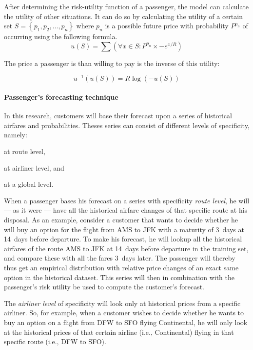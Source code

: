 After determining the risk-utility function of a passenger, the model can calculate the utility of other situations. It can do so by calculating the utility of a certain set $S = \left\{ p_1, p_2, \ldots, p_n\right\}$ where $p_n$ is a possible future price with probability $P^{p_n}$ of occurring using the following formula.
$$
u(S) = \sum (\forall x \in S: P^{p_n} \times -e^{x/R})
$$

The price a passenger is than willing to pay is the inverse of this utility:

$$
u^{-1}(u(S)) = R \log(-u(S))
$$


\paragraph{Passenger's forecasting technique}
In this research, customers will base their forecast upon a series of historical airfares and probabilities. Theses series can consist of different levels of specificity, namely: \begin{inparaenum}
    \item at route level,
    \item at airliner level, and
    \item at a global level.
    \end{inparaenum} When a passenger bases his forecast on a series with specificity \emph{route level}, he will --- as it were --- have all the historical airfare changes of that specific route at his disposal. As an example, consider a customer that wants to decide whether he will buy an option for the flight from AMS to JFK with a maturity of 3~days at 14~days before departure. To make his forecast, he will lookup all the historical airfares of the route AMS to JFK at 14~days before departure in the training set, and compare these with all the fares 3~days later. The passenger will thereby thus get an empirical distribution with relative price changes of an exact same option in the historical dataset. This series will then in combination with the passenger's risk utility be used to compute the customer's forecast.

    The \emph{airliner level} of specificity will look only at historical prices from a specific airliner. So, for example, when a customer wishes to decide whether he wants to buy an option on a flight from DFW to SFO flying Continental, he will only look at the historical prices of that certain airline (i.e., Continental) flying in that specific route (i.e., DFW to SFO).

